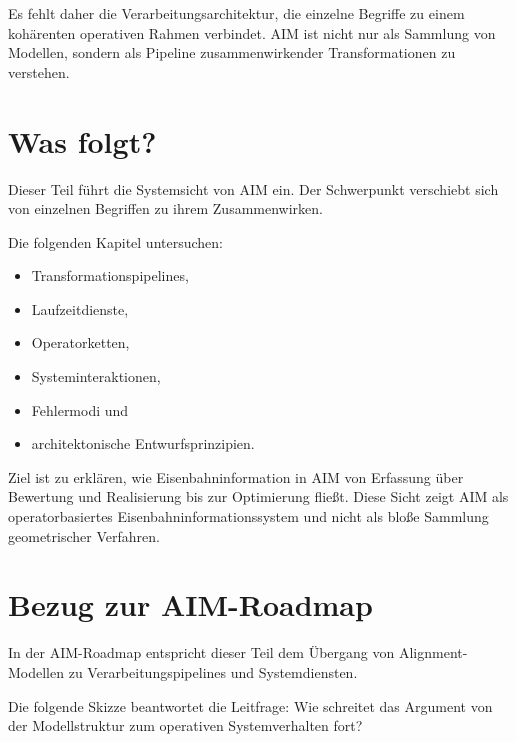 Es fehlt daher die Verarbeitungsarchitektur, die einzelne Begriffe zu einem
kohärenten operativen Rahmen verbindet. AIM ist nicht nur als Sammlung von
Modellen, sondern als Pipeline zusammenwirkender Transformationen zu verstehen.

\section*{Was folgt?}
Dieser Teil führt die Systemsicht von AIM ein. Der Schwerpunkt verschiebt sich
von einzelnen Begriffen zu ihrem Zusammenwirken.

Die folgenden Kapitel untersuchen:
\begin{itemize}
\item Transformationspipelines,
\item Laufzeitdienste,
\item Operatorketten,
\item Systeminteraktionen,
\item Fehlermodi und
\item architektonische Entwurfsprinzipien.
\end{itemize}

Ziel ist zu erklären, wie Eisenbahninformation in AIM von Erfassung über
Bewertung und Realisierung bis zur Optimierung fließt. Diese Sicht zeigt AIM
als operatorbasiertes Eisenbahninformationssystem und nicht als bloße Sammlung
geometrischer Verfahren.

\section*{Bezug zur AIM-Roadmap}
In der AIM-Roadmap entspricht dieser Teil dem Übergang von Alignment-Modellen
zu Verarbeitungspipelines und Systemdiensten.

Die folgende Skizze beantwortet die Leitfrage: Wie schreitet das Argument von
der Modellstruktur zum operativen Systemverhalten fort?

\begin{center}
\end{center}

